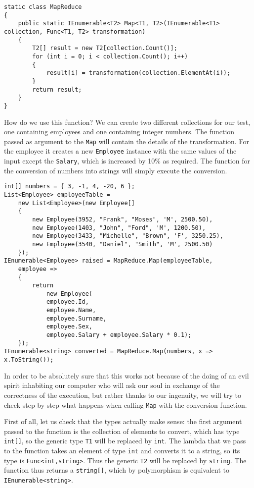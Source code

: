 \begin{lstlisting}
static class MapReduce
{
	public static IEnumerable<T2> Map<T1, T2>(IEnumerable<T1> collection, Func<T1, T2> transformation)
	{
		T2[] result = new T2[collection.Count()];
		for (int i = 0; i < collection.Count(); i++)
		{
			result[i] = transformation(collection.ElementAt(i));
		}
		return result;
	}
}
\end{lstlisting}

\noindent
How do we use this function? We can create two different collections for our test, one containing employees and one containing integer numbers. The function passed as argument to the \texttt{Map} will contain the details of the transformation. For the employee it creates a new \texttt{Employee} instance with the same values of the input except the \texttt{Salary}, which is increased by 10\% as required. The function for the conversion of numbers into strings will simply execute the conversion.

\begin{lstlisting}
int[] numbers = { 3, -1, 4, -20, 6 };
List<Employee> employeeTable =
	new List<Employee>(new Employee[]
	{
		new Employee(3952, "Frank", "Moses", 'M', 2500.50),
		new Employee(1403, "John", "Ford", 'M', 1200.50),
		new Employee(3433, "Michelle", "Brown", 'F', 3250.25),
		new Employee(3540, "Daniel", "Smith", 'M', 2500.50)
	});
IEnumerable<Employee> raised = MapReduce.Map(employeeTable,
	employee =>
	{
		return 
			new Employee(
			employee.Id,
			employee.Name,
			employee.Surname,
			employee.Sex,
			employee.Salary + employee.Salary * 0.1);
	});
IEnumerable<string> converted = MapReduce.Map(numbers, x => x.ToString());
\end{lstlisting}

In order to be absolutely sure that this works not because of the doing of an evil spirit inhabiting our computer who will ask our soul in exchange of the correctness of the execution, but rather thanks to our ingenuity, we will try to check step-by-step what happens when calling \texttt{Map} with the conversion function.

First of all, let us check that the types actually make sense: the first argument passed to the function is the collection of elements to convert, which has type \texttt{int[]}, so the generic type \texttt{T1} will be replaced by \texttt{int}. The lambda that we pass to the function takes an element of type \texttt{int} and converts it to a string, so its type is \texttt{Func<int,string>}. Thus the generic \texttt{T2} will be replaced by \texttt{string}. The function thus returns a \texttt{string[]}, which by polymorphism is equivalent to \texttt{IEnumerable<string>}.

